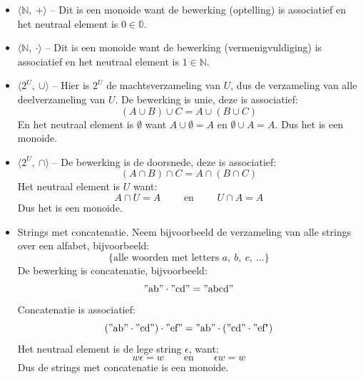 \textbf{}
\begin{itemize}
    \item $\langle \mathbb{N},\ + \rangle$ -- Dit is een monoide want de bewerking (optelling) is associatief en het neutraal element is $0 \in \mathbb{0}$.
    \item $\langle \mathbb{N},\ \cdot \rangle$ -- Dit is een monoide want de bewerking (vermenigvuldiging) is associatief en het neutraal element is $1 \in \mathbb{N}$.
    \item $\langle 2^U,\ \cup \rangle$ -- Hier is $2^U$ de machtsverzameling van $U$, dus de verzameling van alle deelverzameling van $U$. De bewerking is unie, deze is associatief:
    \begin{equation*}
        (A \cup B) \cup C = A \cup (B \cup C)
    \end{equation*}
    En het neutraal element is $\emptyset$ want $A \cup \emptyset = A$ en $\emptyset \cup A = A$. Dus het is een monoide.

    \item $\langle 2^U,\ \cap\rangle$ -- De bewerking is de doorsnede, deze is associatief:
    \begin{equation*}
        (A \cap B) \cap C = A \cap (B \cap C)
    \end{equation*}
    Het neutraal element is $U$ want:
    \begin{equation*}
        A \cap U = A \qquad \text{ en } \qquad U \cap A = A
    \end{equation*}
    Dus het is een monoide.

    \item Strings met concatenatie. Neem bijvoorbeeld de verzameling van alle strings over een alfabet, bijvoorbeeld:
    \begin{equation*}
        \{\text{alle woorden met letters } a,\ b,\ c,\ \dots\}
    \end{equation*}
    De bewerking is concatenatie, bijvoorbeeld:
    \begin{equation*}
        "\text{ab}" \cdot "\text{cd}" = "\text{abcd}"
    \end{equation*}
    Concatenatie is associatief:
    \begin{equation*}
        ("\text{ab}" \cdot "\text{cd}") \cdot "\text{ef}" = "\text{ab}" \cdot ("\text{cd}" \cdot "\text{ef"})
    \end{equation*}
    Het neutraal element is de lege string $\epsilon$, want:
    \begin{equation*}
        w\epsilon = w \qquad \text{en} \qquad \epsilon w = w
    \end{equation*}
    Dus de strings met concatenatie is een monoide.


\end{itemize}
